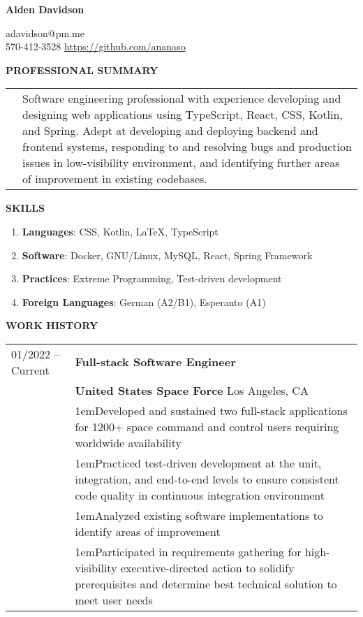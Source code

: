 \documentclass[11pt]{article}
\newlength{\dateColumnWidth}
\newcommand{\customBulletLabel}{\raisebox{0.4ex}{\tiny$\bullet$}}
\def\detail{\par\noindent\makebox[1em][l]{\customBulletLabel}\hangindent1em}
\begin{document}
\begin{center}
\begin{minipage}{0.70\textwidth}
	{\Huge\textbf{Alden Davidson}}
\end{minipage}%
\begin{minipage}{0.30\textwidth}
	\raggedleft
	adavidson@pm.me\\
    570-412-3528
    \url{https://github.com/ananaso}
\end{minipage}
\end{center}
{\Large \textbf{PROFESSIONAL SUMMARY}}
\bigbreak
\begin{tabularx}{\textwidth}{@{}p{\dateColumnWidth}X@{}}
    & Software engineering professional with experience developing and designing web applications using TypeScript, React, CSS, Kotlin, and Spring. Adept at developing and deploying backend and frontend systems, responding to and resolving bugs and production issues in low-visibility environment, and identifying further areas of improvement in existing codebases.
\end{tabularx}
\bigbreak
{\Large \textbf{SKILLS}}
\begin{enumerate}[label={}, itemsep=5pt]
    \item \textbf{Languages}: CSS, Kotlin, \LaTeX, TypeScript
    \item \textbf{Software}: Docker, GNU/Linux, MySQL, React, Spring Framework
    \item \textbf{Practices}: Extreme Programming, Test-driven development
    \item \textbf{Foreign Languages}: German (A2/B1), Esperanto (A1)
\end{enumerate}
\bigbreak
{\Large \textbf{WORK HISTORY}}
\bigbreak
\begin{tabularx}{\textwidth}{@{}p{\dateColumnWidth}X@{}}
    01/2022 -- Current & \textbf{Full-stack Software Engineer} \\
    & \textbf{United States Space Force} \textbar{} Los Angeles, CA \\
    & \detail Developed and sustained two full-stack applications for 1200+ space command and control users requiring worldwide availability \\
    & \detail Practiced test-driven development at the unit, integration, and end-to-end levels to ensure consistent code quality in continuous integration environment \\
    & \detail Analyzed existing software implementations to identify areas of improvement \\
    & \detail Participated in requirements gathering for high-visibility executive-directed action to solidify prerequisites and determine best technical solution to meet user needs
\end{tabularx}
\end{document}

